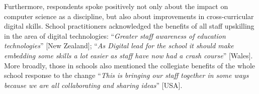 \documentclass[conference]{IEEEtran}
\begin{document}


Furthermore, respondents spoke positively not only about the impact on
computer science as a discipline, but also about improvements in
cross-curricular digital skills. School practitioners acknowledged the
benefits of all staff upskilling in the area of digital technologies:
``{\emph{Greater staff awareness of education technologies}}'' [New
Zealand]; ``{\emph{As Digital lead for the school it should make
embedding some skills a lot easier as staff have now had a crash
course}}'' [Wales]. More broadly, those in schools also mentioned the
collegiate benefits of the whole school response to the change
``{\emph{This is bringing our staff together in some ways because we
are all collaborating and sharing ideas}}'' [USA].


\end{document}
